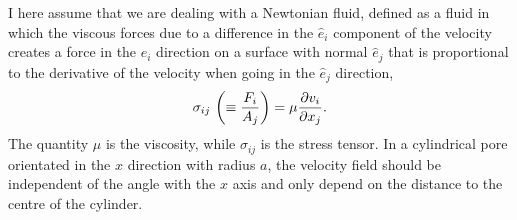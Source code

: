 \documentclass[11pt,british,a4paper]{report}
\begin{document}
I here assume that we are dealing with a Newtonian fluid, defined as a fluid in which the viscous forces due to a difference in the \(\hat{e}_i\) component of the velocity creates a force in the \(\hat{e}_i\) direction on a surface with normal \(\hat{e}_j\) that is proportional to the derivative of the velocity when going in the \(\hat{e}_j\) direction,
\begin{equation}
    \sigma_{ij}\ \qty(\equiv \frac{F_i}{A_j}) = \mu \pdv{v_i}{x_j}.\label{eq:newtfluid}
\end{equation}
The quantity \(\mu\) is the viscosity, while \(\sigma_{ij}\) is the stress tensor. In a cylindrical pore orientated in the \(x\) direction with radius \(a\), the velocity field should be independent of the angle with the \(x\) axis and only depend on the distance to the centre of the cylinder.
\end{document}
